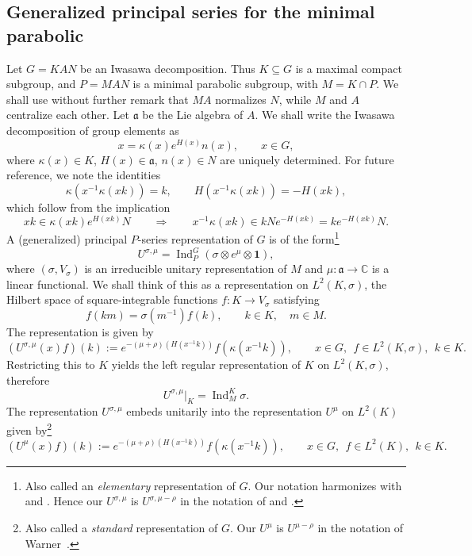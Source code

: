 \documentclass[11pt,oneside]{amsart}
\numberwithin{equation}{section}
\theoremstyle{remark}
\theoremstyle{plain}
\DeclareMathOperator{\Ind}{Ind}
\newcommand\CC{\mathbb{C}}
\newcommand\mfa{\mathfrak{a}}
\begin{document}
\subsection{Generalized principal series for the minimal parabolic}\label{Pseries}
Let $G=KAN$ be an Iwasawa decomposition. Thus $K\subseteq G$ is a maximal compact subgroup, and $P=MAN$ is a minimal parabolic subgroup, with $M=K\cap P$. We shall use without further remark that $MA$ normalizes $N$, while $M$ and $A$ centralize each other. Let $\mfa$ be the Lie algebra of $A$. We shall write the Iwasawa decomposition of group elements as
\begin{equation}\label{iw1}
x=\kappa(x)e^{H(x)}n(x),\qquad x\in G,
\end{equation}
where $\kappa(x)\in K$, $H(x)\in\mfa$, $n(x)\in N$ are uniquely determined. For future reference, we note the identities
\begin{equation}\label{iw5}
\kappa(x^{-1}\kappa(xk))=k,\qquad H(x^{-1}\kappa(xk))=-H(xk),
\end{equation}
which follow from the implication
\[xk\in\kappa(xk)e^{H(xk)}N\qquad\Longrightarrow\qquad x^{-1}\kappa(xk)\in kN e^{-H(xk)}=k e^{-H(xk)}N.\]
A (generalized) principal $P$-series representation of $G$ is of the form\footnote{Also called an \emph{elementary} representation of $G$. Our notation harmonizes with \cite[p.~168]{K} and \cite[p.~660]{KV}. Hence our $U^{\sigma,\mu}$ is $U^{\sigma,\mu-\rho}$ in the notation of \cite[p.~449]{W1} and \cite[p.~271]{C}.}
\[U^{\sigma,\mu}=\Ind_P^G(\sigma\otimes e^{\mu}\otimes\mathbf{1}),\]
where $(\sigma,V_\sigma)$ is an irreducible unitary representation of $M$ and $\mu:\mfa\to\CC$ is a linear functional. We shall think of this as a representation on $L^2(K,\sigma)$, the Hilbert space of square-integrable functions $f:K\to V_{\sigma}$ satisfying
\[f(km)=\sigma(m^{-1})f(k),\qquad k\in K,\quad m\in M.\]
The representation is given by
\[(U^{\sigma,\mu}(x)f)(k):=e^{-(\mu+\rho)(H(x^{-1}k))}f(\kappa(x^{-1}k)),
\qquad x\in G,\ \ f\in L^2(K,\sigma),\ \ k\in K.\]
Restricting this to $K$ yields the left regular representation of $K$ on $L^2(K,\sigma)$, therefore
\begin{equation}\label{indres1}
U^{\sigma,\mu}|_K=\Ind_M^K\sigma.
\end{equation}
The representation $U^{\sigma,\mu}$ embeds unitarily into the representation $U^\mu$ on $L^2(K)$ given by\footnote{Also called a \emph{standard} representation of $G$. Our $U^\mu$ is $U^{\mu-\rho}$ in the notation of Warner~\cite[p.~445]{W1}.}
\[(U^\mu(x)f)(k):=e^{-(\mu+\rho)(H(x^{-1}k))}f(\kappa(x^{-1}k)),\qquad x\in G,\ \ f\in L^2(K),\ \ k\in K.\]
\end{document}
